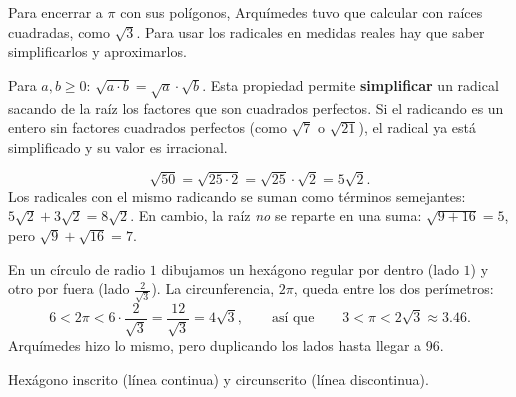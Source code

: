 \documentclass[11pt]{article}
\begin{document}
\label{tema:radicalesaplicaciones}

\begin{hilo}
Para encerrar a $\pi$ con sus polígonos, Arquímedes tuvo que calcular con
raíces cuadradas, como $\sqrt{3}$. Para usar los radicales en medidas reales
hay que saber simplificarlos y aproximarlos.
\end{hilo}

Para $a, b \ge 0$: $\sqrt{a \cdot b} = \sqrt{a} \cdot \sqrt{b}$. Esta
propiedad permite \textbf{simplificar} un radical sacando de la raíz los
factores que son cuadrados perfectos. Si el radicando es un entero sin
factores cuadrados perfectos (como $\sqrt{7}$ o $\sqrt{21}$), el radical ya
está simplificado y su valor es irracional.

\begin{ejemplo}
\[
  \sqrt{50} = \sqrt{25 \cdot 2} = \sqrt{25} \cdot \sqrt{2} = 5\sqrt{2}.
\]
Los radicales con el mismo radicando se suman como términos semejantes:
$5\sqrt{2} + 3\sqrt{2} = 8\sqrt{2}$. En cambio, la raíz \emph{no} se reparte
en una suma: $\sqrt{9 + 16} = 5$, pero $\sqrt{9} + \sqrt{16} = 7$.
\end{ejemplo}

\begin{ejemplo}
En un círculo de radio $1$ dibujamos un hexágono regular por dentro (lado
$1$) y otro por fuera (lado $\frac{2}{\sqrt{3}}$). La circunferencia, $2\pi$,
queda entre los dos perímetros:
\[
  6 < 2\pi < 6 \cdot \frac{2}{\sqrt{3}} = \frac{12}{\sqrt{3}} = 4\sqrt{3},
  \qquad\text{así que}\qquad 3 < \pi < 2\sqrt{3} \approx \num{3,46}.
\]
Arquímedes hizo lo mismo, pero duplicando los lados hasta llegar a 96.
\end{ejemplo}

\begin{center}

{\small Hexágono inscrito (línea continua) y circunscrito (línea discontinua).}
\end{center}
\end{document}
